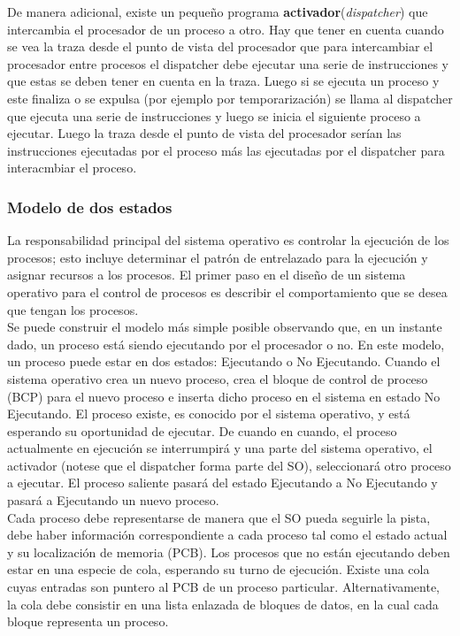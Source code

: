 \documentclass{article}
\begin{document}
			De manera adicional, existe un pequeño programa \textbf{activador}(\textit{dispatcher}) que intercambia el procesador de un proceso a otro. Hay que tener en cuenta cuando se vea la traza desde el punto de vista del procesador que para intercambiar el procesador entre procesos el dispatcher debe ejecutar una serie de instrucciones y que estas se deben tener en cuenta en la traza. Luego si se ejecuta un proceso y este finaliza o se expulsa (por ejemplo por temporarización) se llama al dispatcher que ejecuta una serie de instrucciones y luego se inicia el siguiente proceso a ejecutar. Luego la traza desde el punto de vista del procesador serían las instrucciones ejecutadas por el proceso más las ejecutadas por el dispatcher para interacmbiar el proceso.
			
			\subsubsection{Modelo de dos estados}
				La responsabilidad principal del sistema operativo es controlar la ejecución de los procesos; esto incluye determinar el patrón de entrelazado para la ejecución y asignar recursos a los procesos. El primer paso en el diseño de un sistema operativo para el control de procesos es describir el comportamiento que se desea que tengan los procesos. \\
				
				Se puede construir el modelo más simple posible observando que, en un instante dado, un proceso está siendo ejecutando por el procesador o no. En este modelo, un proceso puede estar en dos estados: Ejecutando o No Ejecutando. Cuando el sistema operativo
crea un nuevo proceso, crea el bloque de control de proceso (BCP) para el nuevo proceso e inserta dicho proceso en el sistema en estado No Ejecutando. El proceso existe, es conocido por el sistema
operativo, y está esperando su oportunidad de ejecutar. De cuando en cuando, el proceso actualmente
en ejecución se interrumpirá y una parte del sistema operativo, el activador (notese que el dispatcher forma parte del SO), seleccionará otro proceso a ejecutar. El proceso saliente pasará del estado Ejecutando a No Ejecutando y pasará a Ejecutando un nuevo proceso. \\
				
				Cada proceso debe representarse de manera que el SO pueda seguirle la pista, debe haber información correspondiente a cada proceso tal como el estado actual y su localización de memoria (PCB). Los procesos que no están ejecutando deben estar en una especie de cola, esperando su turno de ejecución. Existe una cola cuyas entradas son puntero al PCB de un proceso particular. Alternativamente, la cola debe consistir en una lista enlazada de bloques de datos, en la cual cada bloque representa un proceso. \\
				
\end{document}
